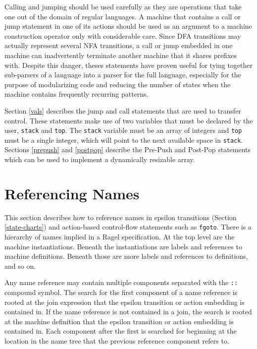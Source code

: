 \documentclass[letterpaper,11pt,oneside]{book}
\begin{document}
Calling and jumping should be used carefully as they are operations that take
one out of the domain of regular languages. A machine that contains a call or
jump statement in one of its actions should be used as an argument to a machine
construction operator only with considerable care. Since DFA transitions may
actually represent several NFA transitions, a call or jump embedded in one
machine can inadvertently terminate another machine that it shares prefixes
with. Despite this danger, theses statements have proven useful for tying
together sub-parsers of a language into a parser for the full language,
especially for the purpose of modularizing code and reducing the number of
states when the machine contains frequently recurring patterns.

Section \ref{vals} describes the jump and call statements that are used to
transfer control. These statements make use of two variables that must be
declared by the user, \verb|stack| and \verb|top|. The \verb|stack| variable
must be an array of integers and \verb|top| must be a single integer, which
will point to the next available space in \verb|stack|. Sections \ref{prepush}
and \ref{postpop} describe the Pre-Push and Post-Pop statements which can be
used to implement a dynamically resizable array.

\section{Referencing Names}
\label{labels}

This section describes how to reference names in epsilon transitions (Section
\ref{state-charts}) and
action-based control-flow statements such as \verb|fgoto|. There is a hierarchy
of names implied in a Ragel specification.  At the top level are the machine
instantiations. Beneath the instantiations are labels and references to machine
definitions. Beneath those are more labels and references to definitions, and
so on.

Any name reference may contain multiple components separated with the \verb|::|
compound symbol.  The search for the first component of a name reference is
rooted at the join expression that the epsilon transition or action embedding
is contained in. If the name reference is not contained in a join,
the search is rooted at the machine definition that the epsilon transition or
action embedding is contained in. Each component after the first is searched
for beginning at the location in the name tree that the previous reference
component refers to.
\end{document}
